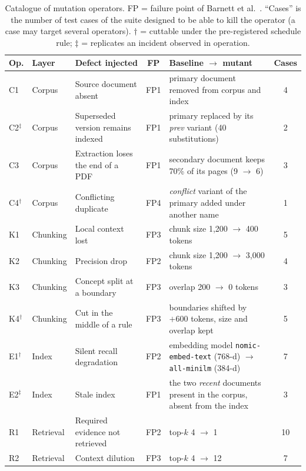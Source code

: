 \documentclass[a4paper,fleqn]{cas-dc}
\newcommand{\code}[1]{\texttt{#1}}
\begin{document}
\begin{table}[width=\textwidth,cols=6,pos=t]
\caption{Catalogue of mutation operators. FP = failure point of Barnett et
al.~\cite{barnett2024seven}. ``Cases'' is the number of test cases of the suite
designed to be able to kill the operator (a case may target several
operators). $\dagger$ = cuttable under the pre-registered schedule rule;
$\ddagger$ = replicates an incident observed in operation.}
\label{tab:operators}
\begin{tabular*}{\tblwidth}{@{} LLLCLC @{}}
\toprule
Op. & Layer & Defect injected & FP & Baseline $\rightarrow$ mutant & Cases \\
\midrule
C1 & Corpus    & Source document absent                    & FP1 & primary document removed from corpus and index & 4 \\
C2$^\ddagger$ & Corpus & Superseded version remains indexed & FP1 & primary replaced by its \emph{prev} variant (40 substitutions) & 2 \\
C3 & Corpus    & Extraction loses the end of a PDF         & FP1 & secondary document keeps 70\% of its pages (9 $\rightarrow$ 6) & 3 \\
C4$^\dagger$ & Corpus & Conflicting duplicate               & FP4 & \emph{conflict} variant of the primary added under another name & 1 \\
\midrule
K1 & Chunking  & Local context lost                        & FP3 & chunk size 1,200 $\rightarrow$ 400 tokens & 5 \\
K2 & Chunking  & Precision drop                            & FP2 & chunk size 1,200 $\rightarrow$ 3,000 tokens & 4 \\
K3 & Chunking  & Concept split at a boundary               & FP3 & overlap 200 $\rightarrow$ 0 tokens & 3 \\
K4$^\dagger$ & Chunking & Cut in the middle of a rule       & FP3 & boundaries shifted by $+600$ tokens, size and overlap kept & 5 \\
\midrule
E1$^\dagger$ & Index & Silent recall degradation           & FP2 & embedding model \code{nomic-embed-text} (768-d) $\rightarrow$ \code{all-minilm} (384-d) & 7 \\
E2$^\ddagger$ & Index & Stale index                        & FP1 & the two \emph{recent} documents present in the corpus, absent from the index & 3 \\
\midrule
R1 & Retrieval & Required evidence not retrieved           & FP2 & top-$k$ 4 $\rightarrow$ 1 & 10 \\
R2 & Retrieval & Context dilution                          & FP3 & top-$k$ 4 $\rightarrow$ 12 & 7 \\

\end{tabular*}
\end{table}
\end{document}
